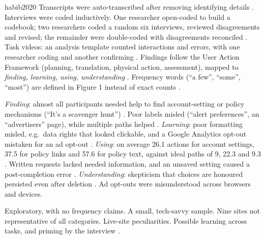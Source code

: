 \begin{papercard}{habib2020}
 Transcripts were auto-transcribed after removing identifying details . Interviews were coded inductively. One researcher open-coded to build a codebook; two researchers coded a random six interviews, reviewed disagreements and revised; the remainder were double-coded with disagreements reconciled . Task videos: an analysis template counted interactions and errors, with one researcher coding and another confirming . Findings follow the User Action Framework (planning, translation, physical action, assessment), mapped to \emph{finding, learning, using, understanding} . Frequency words (``a few'', ``some'', ``most'') are defined in Figure 1 instead of exact counts .

 \emph{Finding}: almost all participants needed help to find account-setting or policy mechanisms (``It's a scavenger hunt'') . Poor labels misled (``alert preferences'', an ``advertisers'' page), while multiple paths helped . \emph{Learning}: poor formatting misled, e.g.\ data rights that looked clickable, and a Google Analytics opt-out mistaken for an ad opt-out . \emph{Using}: on average 26.1 actions for account settings, 37.5 for policy links and 57.6 for policy text, against ideal paths of 9, 22.3 and 9.3 . Written requests lacked needed information, and an unsaved setting caused a post-completion error . \emph{Understanding}: skepticism that choices are honoured persisted even after deletion . Ad opt-outs were misunderstood across browsers and devices.

 Exploratory, with no frequency claims. A small, tech-savvy sample. Nine sites not representative of all categories. Live-site peculiarities. Possible learning across tasks, and priming by the interview .


\end{papercard}
